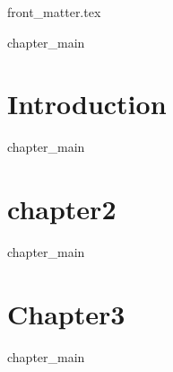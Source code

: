 \documentclass[drafts]{dissertation}
\begin{document}
	\sloppy
	\def \myAuthorName{Name}
	\def \myTitle{Totle}
	\def \mySubTitle{Subtitle}


\newcommand{\mainrq}{
	\medskip
	\textit{
		Reasearch Question?
	}
	\medskip
}

\ifdraft
\else
	{front_matter.tex}
\fi

\tableofcontents
\ifdraft
\fi

%
\mainmatter
\thumbtrue

\chaptwotrue


\ifchapone
{chapter_main}
\else
\chapter{Introduction} %
\label{chapter:introduction}
\fi

\ifchaptwo
	{chapter_main}
\else
	\chapter{chapter2}
	\label{chapter:2}
\fi

\ifchapthree
     {chapter_main}
\else
	\chapter{Chapter3}
	\label{chapter:3}
\fi

\ifchapfour
     {chapter_main}
 \else
\end{document}
